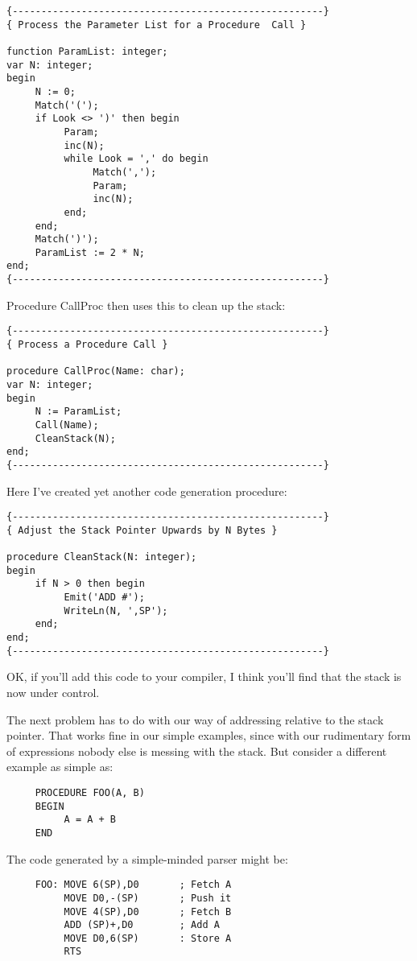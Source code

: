 \begin{verbatim}
{------------------------------------------------------}
{ Process the Parameter List for a Procedure  Call }

function ParamList: integer;
var N: integer;
begin
     N := 0;
     Match('(');
     if Look <> ')' then begin
          Param;
          inc(N);
          while Look = ',' do begin
               Match(',');
               Param;
               inc(N);
          end;
     end;
     Match(')');
     ParamList := 2 * N;
end;
{------------------------------------------------------}
\end{verbatim}

Procedure CallProc then uses this to clean up the stack:

\begin{verbatim}
{------------------------------------------------------}
{ Process a Procedure Call }

procedure CallProc(Name: char);
var N: integer;
begin
     N := ParamList;
     Call(Name);
     CleanStack(N);
end;
{------------------------------------------------------}
\end{verbatim}

Here I've created yet another code generation procedure:

\begin{verbatim}
{------------------------------------------------------}
{ Adjust the Stack Pointer Upwards by N Bytes }

procedure CleanStack(N: integer);
begin
     if N > 0 then begin
          Emit('ADD #');
          WriteLn(N, ',SP');
     end;
end;
{------------------------------------------------------}
\end{verbatim}

OK, if you'll add this code to your compiler, I think you'll find that the stack is now under control.

The next problem has to do with our way of addressing relative to the stack pointer. That works fine in our simple examples, since with our rudimentary  form  of expressions nobody else is messing with the stack. But consider a different example as simple as:

\begin{verbatim}
     PROCEDURE FOO(A, B)
     BEGIN
          A = A + B
     END
\end{verbatim}

The code generated by a simple-minded parser might be:

\begin{verbatim}
     FOO: MOVE 6(SP),D0       ; Fetch A
          MOVE D0,-(SP)       ; Push it
          MOVE 4(SP),D0       ; Fetch B
          ADD (SP)+,D0        ; Add A
          MOVE D0,6(SP)       : Store A
          RTS
\end{verbatim}

